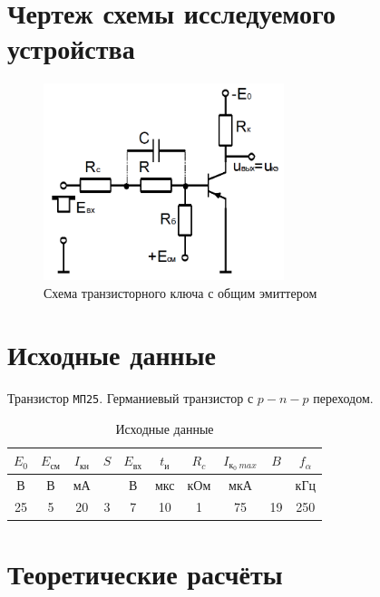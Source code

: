 \documentclass[a4paper,14pt]{extarticle}
\begin{document}
\section{Чертеж схемы исследуемого устройства}

\begin{figure}[H]
\begin{center}
	\vspace{-0.5cm}
	\includegraphics[width=7cm]{scheme}
	\caption{Схема транзисторного ключа с общим эмиттером}
	\vspace{-0.5cm}
\end{center}
\end{figure}

\section{Исходные данные}

Транзистор \verb+МП25+. Германиевый транзистор с $p-n-p$ переходом.

\begin{table}[H]
\begin{center}
	\caption{Исходные данные}
	\def\arraystretch{1.3}
	\def\tabcolsep{12pt}
	\begin{tabular}{|c|c|c|c|c|c|c|c|c|c|}
		\hline
		$E_0$ &
		$E_\text{см}$ &
		$I_\text{кн}$ &
		$S$ &
		$E_\text{вх}$ &
		$t_\text{и}$ &
		$R_c$ &
		$I_{\text{к}_0\ max}$ &
		$B$ &
		$f_\alpha$ \\
		\hline
		В &
		В &
		мА &
		 &
		В &
		мкс &
		кОм &
		мкА &
		 &
		кГц \\
		\hline
		25 &
		5 &
		20 &
		3 &
		7 &
		10 &
		1 &
		75 &
		19 &
		250 \\
	    \hline	
	\end{tabular}
\end{center}
\end{table}

\section{Теоретические расчёты}
\end{document}
